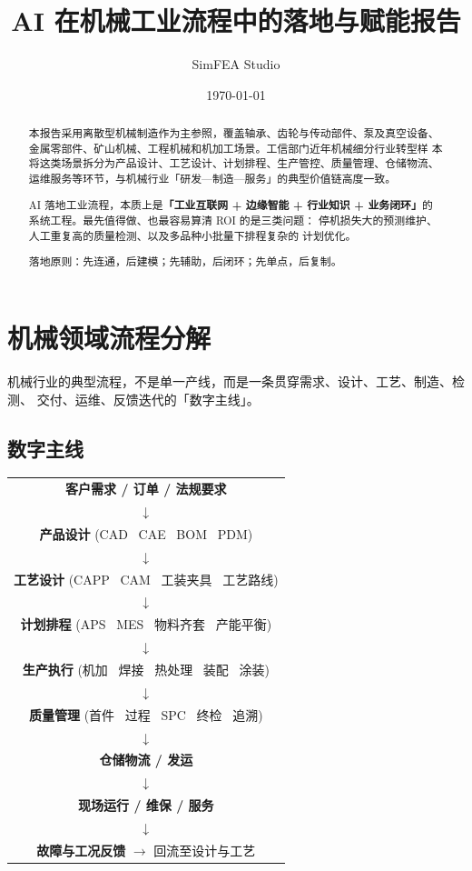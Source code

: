 \documentclass[a4paper,12pt]{ctexart}
\title{\textbf{AI 在机械工业流程中的落地与赋能报告}}
\author{SimFEA Studio}
\date{\today}
\begin{document}
\maketitle

\begin{abstract}
\noindent
本报告采用离散型机械制造作为主参照，覆盖轴承、齿轮与传动部件、泵及真空设备、
金属零部件、矿山机械、工程机械和机加工场景。工信部门近年机械细分行业转型样
本将这类场景拆分为产品设计、工艺设计、计划排程、生产管控、质量管理、仓储物流、
运维服务等环节，与机械行业「研发—制造—服务」的典型价值链高度一致。

AI 落地工业流程，本质上是\textbf{「工业互联网 + 边缘智能 + 行业知识 +
业务闭环」}的系统工程。最先值得做、也最容易算清 ROI 的是三类问题：
停机损失大的预测维护、人工重复高的质量检测、以及多品种小批量下排程复杂的
计划优化。

\begin{keypoint}
落地原则：先连通，后建模；先辅助，后闭环；先单点，后复制。
\end{keypoint}
\end{abstract}

\tableofcontents
\newpage

\section{机械领域流程分解}

机械行业的典型流程，不是单一产线，而是一条贯穿需求、设计、工艺、制造、检测、
交付、运维、反馈迭代的「数字主线」。

\subsection{数字主线}

\begin{center}
\begin{tabular}{c}
\textbf{客户需求 / 订单 / 法规要求} \\
$\downarrow$ \\
\textbf{产品设计} \quad (CAD \ CAE \ BOM \ PDM) \\
$\downarrow$ \\
\textbf{工艺设计} \quad (CAPP \ CAM \ 工装夹具 \ 工艺路线) \\
$\downarrow$ \\
\textbf{计划排程} \quad (APS \ MES \ 物料齐套 \ 产能平衡) \\
$\downarrow$ \\
\textbf{生产执行} \quad (机加 \ 焊接 \ 热处理 \ 装配 \ 涂装) \\
$\downarrow$ \\
\textbf{质量管理} \quad (首件 \ 过程 \ SPC \ 终检 \ 追溯) \\
$\downarrow$ \\
\textbf{仓储物流 / 发运} \\
$\downarrow$ \\
\textbf{现场运行 / 维保 / 服务} \\
$\downarrow$ \\
\textbf{故障与工况反馈} $\rightarrow$ 回流至设计与工艺
\end{tabular}
\end{center}
\end{document}
